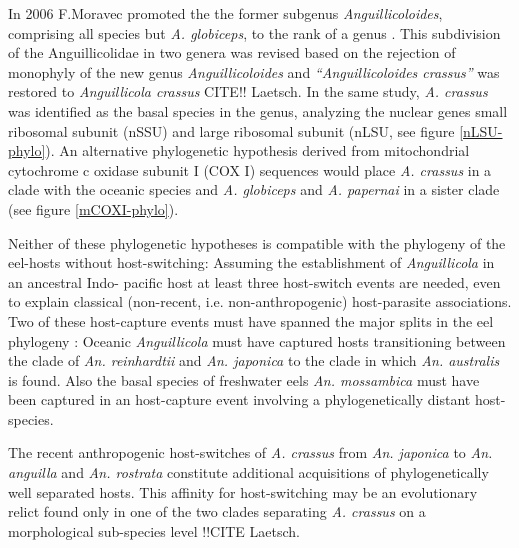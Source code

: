 In 2006 F.Moravec promoted the the former subgenus
\textit{Anguillicoloides}, comprising all species but
\textit{A. globiceps}, to the rank of a genus
\cite{moravec_anguillicoloides}. This subdivision of the
Anguillicolidae in two genera was revised based on the rejection of
monophyly of the new genus \textit{Anguillicoloides} and
\textit{``Anguillicoloides crassus''} was restored to
\textit{Anguillicola crassus} CITE!! Laetsch. In the same study,
\textit{A. crassus} was identified as the basal species in the genus,
analyzing the nuclear genes small ribosomal subunit (nSSU) and large
ribosomal subunit (nLSU, see figure \ref{nLSU-phylo}). An alternative
phylogenetic hypothesis derived from mitochondrial cytochrome c oxidase
subunit I (COX I) sequences would place \textit{A. crassus} in a clade
with the oceanic species and \textit{A. globiceps} and
\textit{A. papernai} in a sister clade (see figure \ref{mCOXI-phylo}).

Neither of these phylogenetic hypotheses is compatible with the
phylogeny of the eel-hosts without host-switching: Assuming the
establishment of \textit{Anguillicola} in an ancestral Indo- pacific
host at least three host-switch events are needed, even to explain
classical (non-recent, i.e. non-anthropogenic) host-parasite
associations. Two of these host-capture events must have spanned the
major splits in the eel phylogeny \cite{minegishi_molecular_2005}:
Oceanic \textit{Anguillicola} must have captured hosts transitioning
between the clade of \textit{An. reinhardtii} and
\textit{An. japonica} to the clade in which \textit{An. australis} is
found. Also the basal species of freshwater eels
\textit{An. mossambica} must have been captured in an host-capture
event involving a phylogenetically distant host-species.


The recent anthropogenic host-switches of \textit{A. crassus} from
\textit{An. japonica} to \textit{An. anguilla} and
\textit{An. rostrata} constitute additional acquisitions of
phylogenetically well separated hosts. This affinity for
host-switching may be an evolutionary relict found only in one of the
two clades separating \textit{A. crassus} on a morphological
sub-species level !!CITE Laetsch.

